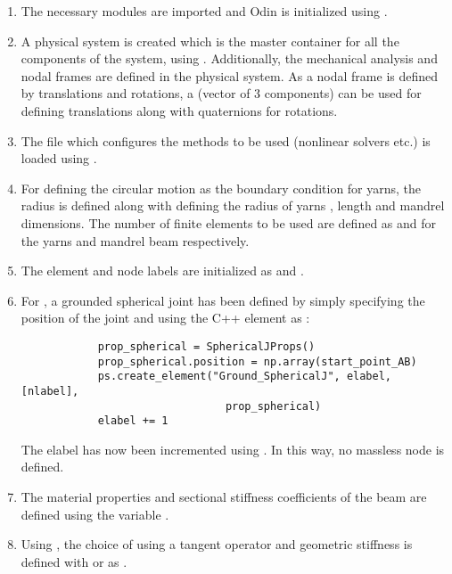 \begin{enumerate}
    \item The necessary modules are imported and Odin is initialized using .
    \item A physical system is created which is the master container for all the components of the system, using . Additionally, the mechanical analysis and nodal frames are defined in the physical system. As a nodal frame is defined by translations and rotations, a  (vector of 3 components) can be used for defining translations along with quaternions for rotations.
    \item The  file which configures the methods to be used (nonlinear solvers etc.) is loaded using .
    \item For defining the circular motion as the boundary condition for yarns, the radius  is defined along with defining the radius of yarns , length  and mandrel dimensions. The number of finite elements to be used are defined as  and  for the yarns and mandrel beam respectively.
    \item The element and node labels are initialized as  and .
    \item For , a grounded spherical joint has been defined by simply specifying the position of the joint and using the C++ element  as :
        \pythonstyle
        \begin{lstlisting}
            prop_spherical = SphericalJProps()
            prop_spherical.position = np.array(start_point_AB)
            ps.create_element("Ground_SphericalJ", elabel, [nlabel],
                                prop_spherical)
            elabel += 1 
        \end{lstlisting}
        The elabel has now been incremented using . In this way, no massless node is defined.
    \item The material properties and sectional stiffness coefficients of the beam are defined using the variable . 
    \item Using , the choice of using a tangent operator and geometric stiffness is defined with  or  as .

\end{enumerate}
